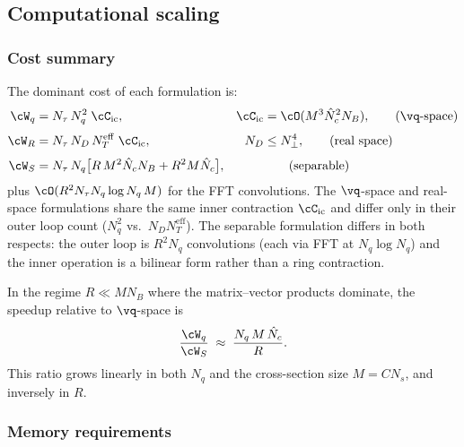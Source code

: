 \subsection{Computational scaling}
\label{sub:scaling}

\subsubsection{Cost summary}

The dominant cost of each formulation is:
\begin{align}
  \cW_q &= N_\tau\,N_q^2\;\cC_\mathrm{ic},
  &\cC_\mathrm{ic} &= \cO(M^3\hat{N}_c^2 N_B),
  \tag{$\vq$-space}
  \label{eq:scaling_q}\\[3pt]
  \cW_R &= N_\tau\,N_D\,N_T^\mathrm{eff}\;\cC_\mathrm{ic},
  &N_D &\le N_\perp^4,
  \tag{real space}
  \label{eq:scaling_R}\\[3pt]
  \cW_S &= N_\tau\,N_q\bigl[
      R\,M^2\hat{N}_c N_B + R^2 M\hat{N}_c
    \bigr],
  && \tag{separable}
  \label{eq:scaling_S}
\end{align}
plus $\cO(R^2 N_\tau N_q\log N_q\,M)$ for the FFT
convolutions.  The $\vq$-space and real-space formulations share
the same inner contraction $\cC_\mathrm{ic}$ and differ only in
their outer loop count ($N_q^2$ vs.\ $N_D N_T^\mathrm{eff}$).
The separable formulation differs in both respects: the outer loop
is $R^2 N_q$ convolutions (each via FFT at $N_q\log N_q$) and the
inner operation is a bilinear form rather than a ring contraction.

In the regime $R \ll MN_B$ where the matrix--vector products
dominate, the speedup relative to $\vq$-space is
\begin{equation}
  \frac{\cW_q}{\cW_S}
  \;\approx\;
  \frac{N_q\,M\,\hat{N}_c}{R}.
  \label{eq:speedup}
\end{equation}
This ratio grows linearly in both $N_q$ and the cross-section size
$M = CN_s$, and inversely in $R$.

\subsubsection{Memory requirements}

